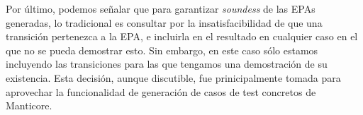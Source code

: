 Por último, podemos señalar que para garantizar \textit{soundess} de las EPAs generadas, lo tradicional es consultar por la insatisfacibilidad de que una transición pertenezca a la EPA, e incluirla en el resultado en cualquier caso en el que no se pueda demostrar esto.
Sin embargo, en este caso sólo estamos incluyendo las transiciones para las que tengamos una demostración de su existencia.
Esta decisión, aunque discutible, fue prinicipalmente tomada para aprovechar la funcionalidad de generación de casos de test concretos de Manticore.



